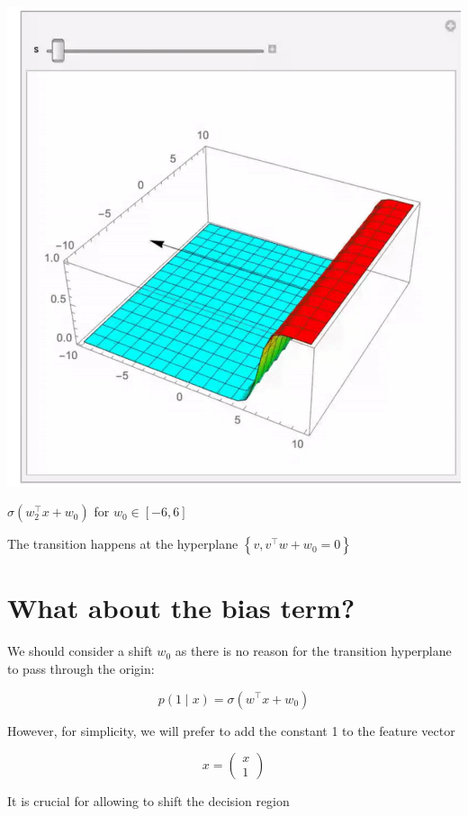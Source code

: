 \documentclass[10pt]{article}
\begin{document}
\begin{center}
\includegraphics[max width=\textwidth]{2023_12_30_261a5c67f471a6c49904g-11}
\end{center}

$\sigma\left(w_{2}^{\top} x+w_{0}\right)$ for $w_{0} \in[-6,6]$

The transition happens at the hyperplane $\left\{v, v^{\top} w+w_{0}=0\right\}$

\section*{What about the bias term?}
We should consider a shift $w_{0}$ as there is no reason for the transition hyperplane to pass through the origin:

$$
p(1 \mid x)=\sigma\left(w^{\top} x+w_{0}\right)
$$

However, for simplicity, we will prefer to add the constant 1 to the feature vector

$$
x=\left(\begin{array}{c}
x \\
1
\end{array}\right)
$$

It is crucial for allowing to shift the decision region
\end{document}
